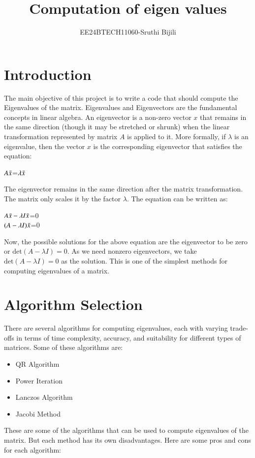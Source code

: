 \documentclass[journal]{IEEEtran}
\begin{document}

\vspace{3cm}

\title{Computation of eigen values}
\author{EE24BTECH11060-Sruthi Bijili}
{\let\newpage\relax\maketitle}

\renewcommand{\thefigure}{\theenumi}
\renewcommand{\thetable}{\theenumi}
\setlength{\intextsep}{10pt} %


\renewcommand{\thetable}{\theenumi}
\section*{Introduction}
The main objective of this project is to write a code that should compute the Eigenvalues of the matrix. Eigenvalues and Eigenvectors are the fundamental concepts in linear algebra. An eigenvector is a non-zero vector $x$ that remains in the same direction (though it may be stretched or shrunk) when the linear transformation represented by matrix $A$ is applied to it. More formally, if $\lambda$ is an eigenvalue, then the vector $x$ is the corresponding eigenvector that satisfies the equation:
\begin{center}
    $A\Bar{x}$=$\lambda \Bar{x}$
\end{center}
The eigenvector remains in the same direction after the matrix transformation. The matrix only scales it by the factor $\lambda$. The equation can be written as:
\begin{center}
    $A\Bar{x}-\lambda I\Bar{x}$=$0$\\
    $(A-\lambda I)\Bar{x}$=$0$
\end{center}
Now, the possible solutions for the above equation are the eigenvector to be zero or $\text{det} (A - \lambda I) = 0$. As we need nonzero eigenvectors, we take $\text{det}(A - \lambda I) = 0$ as the solution. This is one of the simplest methods for computing eigenvalues of a matrix.
\section*{Algorithm Selection}
There are several algorithms for computing eigenvalues, each with varying trade-offs in terms of time complexity, accuracy, and suitability for different types of matrices. Some of these algorithms are:
\begin{itemize}
    \item QR Algorithm
    \item Power Iteration
    \item Lanczos Algorithm
    \item Jacobi Method
\end{itemize}
These are some of the algorithms that can be used to compute eigenvalues of the matrix. But each method has its own disadvantages. Here are some pros and cons for each algorithm:
\end{document}
